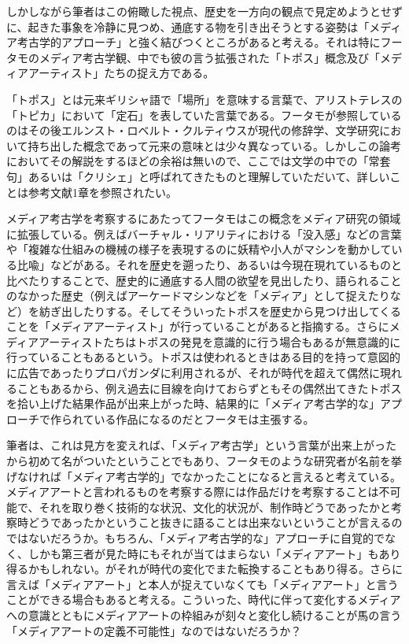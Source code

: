 \documentclass[a4paper,report]{jsbook}
\begin{document}
しかしながら筆者はこの俯瞰した視点、歴史を一方向の観点で見定めようとせずに、起きた事象を冷静に見つめ、通底する物を引き出そうとする姿勢は「メディア考古学的アプローチ」と強く結びつくところがあると考える。それは特にフータモのメディア考古学観、中でも彼の言う拡張された「トポス」概念及び「メディアアーティスト」たちの捉え方である。

「トポス」とは元来ギリシャ語で「場所」を意味する言葉で、アリストテレスの「トピカ」において「定石」を表していた言葉である。フータモが参照しているのはその後エルンスト・ロベルト・クルティウスが現代の修辞学、文学研究において持ち出した概念であって元来の意味とは少々異なっている。しかしこの論考においてその解説をするほどの余裕は無いので、ここでは文学の中での「常套句」あるいは「クリシェ」と呼ばれてきたものと理解していただいて、詳しいことは参考文献\autocite{huhtamo:mediaarcheology}1章を参照されたい。

メディア考古学を考察するにあたってフータモはこの概念をメディア研究の領域に拡張している。例えばバーチャル・リアリティにおける「没入感」などの言葉や「複雑な仕組みの機械の様子を表現するのに妖精や小人がマシンを動かしている比喩」などがある。それを歴史を遡ったり、あるいは今現在現れているものと比べたりすることで、歴史的に通底する人間の欲望を見出したり、語られることのなかった歴史（例えばアーケードマシンなどを「メディア」として捉えたりなど）を紡ぎ出したりする。そしてそういったトポスを歴史から見つけ出してくることを「メディアアーティスト」が行っていることがあると指摘する。さらにメディアアーティストたちはトポスの発見を意識的に行う場合もあるが無意識的に行っていることもあるという。トポスは使われるときはある目的を持って意図的に広告であったりプロパガンダに利用されるが、それが時代を超えて偶然に現れることもあるから、例え過去に目線を向けておらずともその偶然出てきたトポスを拾い上げた結果作品が出来上がった時、結果的に「メディア考古学的な」アプローチで作られている作品になるのだとフータモは主張する。

筆者は、これは見方を変えれば、「メディア考古学」という言葉が出来上がったから初めて名がついたということでもあり、フータモのような研究者が名前を挙げなければ「メディア考古学的」でなかったことになると言えると考えている。メディアアートと言われるものを考察する際には作品だけを考察することは不可能で、それを取り巻く技術的な状況、文化的状況が、制作時どうであったかと考察時どうであったかということ抜きに語ることは出来ないということが言えるのではないだろうか。もちろん、「メディア考古学的な」アプローチに自覚的でなく、しかも第三者が見た時にもそれが当てはまらない「メディアアート」もあり得るかもしれない。がそれが時代の変化でまた転換することもあり得る。さらに言えば「メディアアート」と本人が捉えていなくても「メディアアート」と言うことができる場合もあると考える。こういった、時代に伴って変化するメディアへの意識とともにメディアアートの枠組みが刻々と変化し続けることが馬の言う「メディアアートの定義不可能性」なのではないだろうか？
\end{document}
